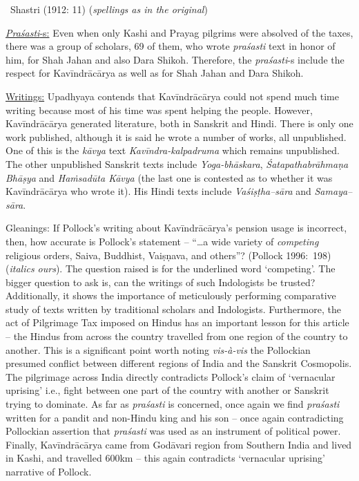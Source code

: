 \begin{enumerate}
\begin{myquote}
~\hfill Shastri (1912: 11) (\textit{spellings as in the original})
\end{myquote}

 \underline{\textit{Praśasti}-s:} Even when only Kashi and Prayag pilgrims were absolved of the taxes, there was a group of scholars, 69 of them, who wrote \textit{praśasti} text in honor of him, for Shah Jahan and also Dara Shikoh. Therefore, the \textit{praśasti}-s include the respect for Kavīndrācārya as well as for Shah Jahan and Dara Shikoh.

 \underline{Writings:} Upadhyaya contends that Kavīndrācārya could not spend much time writing because most of his time was spent helping the people. However, Kavīndrācārya generated literature, both in Sanskrit and Hindi. There is only one work published, although it is said he wrote a number of works, all unpublished. One of this is the \textit{kāvya} text \textit{Kavīndra-kalpadruma} which remains unpublished. The other unpublished Sanskrit texts include \textit{Yoga-bhāskara}, \textit{Śatapathabrāhmaṇa Bhāṣya} and \textit{Haṁsadūta Kāvya} (the last one is contested as to whether it was Kavīndrācārya who wrote it). His Hindi texts include \textit{Vaśiṣṭha--sāra} and \textit{Samaya--sāra}.

 Gleanings: If Pollock’s writing about Kavīndrācārya’s pension usage is incorrect, then, how accurate is Pollock’s statement – “…a wide variety of \textit{competing} religious orders, Saiva, Buddhist, Vaiṣṇava, and others”? (Pollock 1996:~198)(\textit{italics ours}). The question raised is for the underlined word ‘competing’. The bigger question to ask is, can the writings of such Indologists be trusted? Additionally, it shows the importance of meticulously performing comparative study of texts written by traditional scholars and Indologists. Furthermore, the act of Pilgrimage Tax imposed on Hindus has an important lesson for this article – the Hindus from across the country travelled from one region of the country to another. This is a significant point worth noting \textit{vis-à-vis} the Pollockian presumed conflict between different regions of India and the Sanskrit Cosmopolis. The pilgrimage across India directly contradicts Pollock’s claim of ‘vernacular uprising’ i.e., fight between one part of the country with another or Sanskrit trying to dominate. As far as \textit{praśasti} is concerned, once again we find \textit{praśasti} written for a pandit and non-Hindu king and his son – once again contradicting Pollockian assertion that \textit{praśasti} was used as an instrument of political power. Finally, Kavīndrācārya came from Godāvari region from Southern India and lived in Kashi, and travelled 600km – this again contradicts ‘vernacular uprising’ narrative of Pollock.


\end{enumerate}
